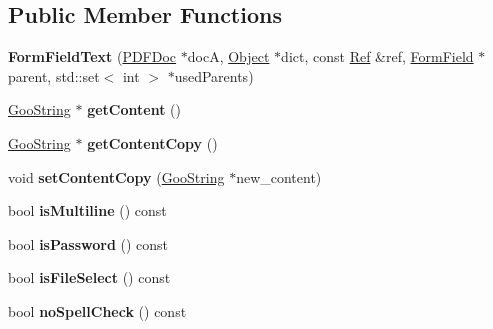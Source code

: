 \subsection*{Public Member Functions}
\begin{DoxyCompactItemize}
\item 
\mbox{\label{class_form_field_text_a2e5fe0fc7407fcef04f172fa5efde031}} 
{\bfseries Form\+Field\+Text} (\hyperlink{class_p_d_f_doc}{P\+D\+F\+Doc} $\ast$docA, \hyperlink{class_object}{Object} $\ast$dict, const \hyperlink{struct_ref}{Ref} \&ref, \hyperlink{class_form_field}{Form\+Field} $\ast$parent, std\+::set$<$ int $>$ $\ast$used\+Parents)
\item 
\mbox{\label{class_form_field_text_a2161de3b4c8fbb434cf44dfe620a5855}} 
\hyperlink{class_goo_string}{Goo\+String} $\ast$ {\bfseries get\+Content} ()
\item 
\mbox{\label{class_form_field_text_a1558671d0cb4876b7ad936e72dff058c}} 
\hyperlink{class_goo_string}{Goo\+String} $\ast$ {\bfseries get\+Content\+Copy} ()
\item 
\mbox{\label{class_form_field_text_ad5476785bf0e6e5669572dd980d48136}} 
void {\bfseries set\+Content\+Copy} (\hyperlink{class_goo_string}{Goo\+String} $\ast$new\+\_\+content)
\item 
\mbox{\label{class_form_field_text_a9d7d60a538e3b77ac051d50b1e7abc0d}} 
bool {\bfseries is\+Multiline} () const
\item 
\mbox{\label{class_form_field_text_a35a02b24c20aa50b7c4ac7841a71d903}} 
bool {\bfseries is\+Password} () const
\item 
\mbox{\label{class_form_field_text_a19ed5be7c1b97a05622ac9074207c0f1}} 
bool {\bfseries is\+File\+Select} () const
\item 
\mbox{\label{class_form_field_text_af8ed1200d44efd17415285d6bde82cf7}} 
bool {\bfseries no\+Spell\+Check} () const
\item 
\mbox{\label{class_form_field_text_a72e32b45f35bb7a9decc9cf515dc049b}} 

\end{DoxyCompactItemize}
